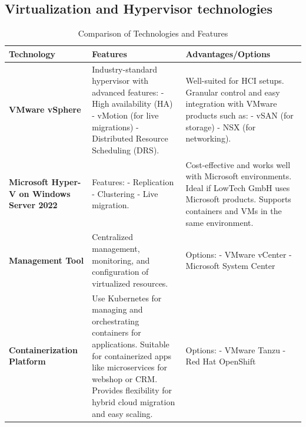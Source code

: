 \documentclass{llncs}
\begin{document}
\subsection{Virtualization and Hypervisor technologies}
\vspace{-10pt}
\begin{table}[H]
  \setlength{\tabcolsep}{5pt} %
  \renewcommand{\arraystretch}{1.2} %
  \centering
  \begin{tabular}{|p{3.5cm}|p{7cm}|p{4.5cm}|}
  \hline
  \textbf{Technology} & \textbf{Features} & \textbf{Advantages/Options} \\
  \hline
  
  \textbf{VMware vSphere} & 
  Industry-standard hypervisor with advanced features: \newline 
  - High availability (HA) \newline 
  - vMotion (for live migrations) \newline 
  - Distributed Resource Scheduling (DRS). & 
  Well-suited for HCI setups. \newline 
  Granular control and easy integration with VMware products such as: \newline 
  - vSAN (for storage) \newline 
  - NSX (for networking). \\
  \hline
  
  \textbf{Microsoft Hyper-V on Windows Server 2022} & 
  Features: \newline 
  - Replication \newline 
  - Clustering \newline 
  - Live migration. & 
  Cost-effective and works well with Microsoft environments. \newline 
  Ideal if LowTech GmbH uses Microsoft products. \newline 
  Supports containers and VMs in the same environment. \\
  \hline
  
  \textbf{Management Tool} & 
  Centralized management, monitoring, and configuration of virtualized resources. & 
  Options: \newline 
  - VMware vCenter \newline 
  - Microsoft System Center \\
  \hline
  
  \textbf{Containerization Platform} & 
  Use Kubernetes for managing and orchestrating containers for applications. \newline 
  Suitable for containerized apps like microservices for webshop or CRM. \newline 
  Provides flexibility for hybrid cloud migration and easy scaling. & 
  Options: \newline 
  - VMware Tanzu \newline 
  - Red Hat OpenShift \\
  \hline
  
  \end{tabular}
  \caption{Comparison of Technologies and Features}
  \label{tab:technologies}
  \end{table}
  
\end{document}

